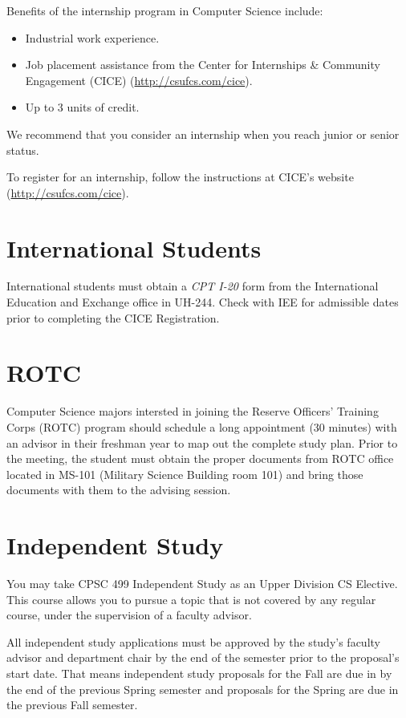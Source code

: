 \documentclass{book}
\newcommand{\shrunkurl}[1]{\url{http://csufcs.com/#1}}
\begin{document}
Benefits of the internship program in Computer Science include:
\begin{itemize}
\item Industrial work experience.
\item Job placement assistance from the Center for Internships \& Community Engagement (CICE) (\shrunkurl{cice}).
\item Up to 3 units of credit.
\end{itemize}

We recommend that you consider an internship when you reach junior or senior status.

To register for an internship, follow the instructions at CICE's website (\shrunkurl{cice}).

\section{International Students}

International students must obtain a \emph{CPT I-20} form from the International Education and Exchange office in UH-244. Check with IEE for admissible dates prior to completing the CICE Registration.

\section{ROTC}

Computer Science majors intersted in joining the Reserve Officers' Training
Corps (ROTC) program should schedule a long appointment (30 minutes) with an
advisor in their freshman year to map out the complete study plan.  Prior to
the meeting, the student must obtain the proper documents from ROTC office
located in MS-101 (Military Science Building room 101) and bring those
documents with them to the advising session.

\section{Independent Study}

You may take CPSC 499 Independent Study as an Upper Division CS Elective. This course allows you to pursue a topic that is not covered by any regular course, under the supervision of a faculty advisor.

All independent study applications must be approved by the study's faculty advisor and department chair by the
end of the semester prior to the proposal’s start date. That means independent study proposals for the Fall are due in
by the end of the previous Spring semester and proposals for the Spring are due in the previous Fall semester.
\end{document}
